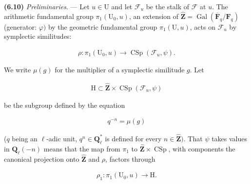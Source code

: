 \documentclass[10pt,leqno]{article}
\begin{document}
\noindent \textbf{(6.10)} \emph{Preliminaries}. — Let \(u\in \mathrm{U}\) and let \(\mathcal{F} _{u}\) be the stalk of \(\mathcal{F} \) at \(u\). The arithmetic fundamental group \(\pi _{1}(\mathrm{U}_{0},u)\), an extension of \(\widehat{\mathbf{Z}}=\operatorname{Gal}(\overline{\mathbf{F}}_{q}/\mathbf{F}_{q})\) (generator: \(\varphi )\) by the geometric fundamental group \(\pi _{1}(\mathrm{U},u)\), acts on \(\mathcal{F} _{u}\) by symplectic similitudes:\par

\begin{equation*}\begin{gathered}\rho  : \pi _{1}(\mathrm{U}_{0},u) \longrightarrow  \operatorname{CSp}(\mathcal{F} _{u},\psi ).\end{gathered}\end{equation*}

\clearpage

\label{physical-27}\setcounter{page}{298}

\noindent We write \(\mu (g)\) for the multiplier of a symplectic similitude \(g\). Let\par

\begin{equation*}\begin{gathered}\mathrm{H}\subset \widehat{\mathbf{Z}}\times \operatorname{CSp}(\mathcal{F} _{u},\psi )\end{gathered}\end{equation*}

\noindent be the subgroup defined by the equation\par

\begin{equation*}\begin{gathered}q^{- n}=\mu (g)\end{gathered}\end{equation*}

\noindent (\(q\) being an \(\ell \)-adic unit, \(q^{n}\in \mathbf{Q}_{\ell }^{*}\) is defined for every \(n\in \widehat{\mathbf{Z}})\). That \(\psi \) takes values in \(\mathbf{Q}_{\ell }(- n)\) means that the map from \(\pi _{1}\) to \(\widehat{\mathbf{Z}}\times \operatorname{CSp}\), with components the canonical projection onto \(\widehat{\mathbf{Z}}\) and \(\rho \), factors through\par

\begin{equation*}\begin{gathered}\rho _{1} : \pi _{1}(\mathrm{U}_{0},u) \longrightarrow  \mathrm{H}.\end{gathered}\end{equation*}
\end{document}
